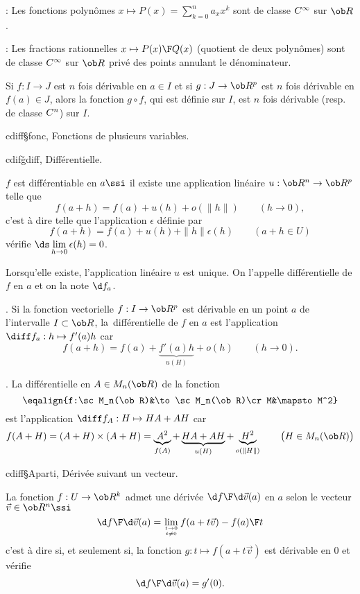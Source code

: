 \Remarque : Les fonctions polynômes $x\mapsto P(x)=\sum_{k=0}^n a_xx^k$ sont de classe $\sc C^\infty$ 
sur $\ob R$. 
\bigskip

\Remarque  : Les fractions rationnelles $x\mapsto {P(x)\F Q(x)}$ (quotient de deux polynômes) sont de classe $\sc C^\infty$ sur $\ob R$ privé des points annulant le dénominateur. 
\bigskip

\Theoreme [$I$ et $J$ intervalles] 
Si $f:I\to J$ est $n$ fois dérivable en $a\in I$ et si $g:J\to\ob R^p$ est $n$ fois dérivable en $f(a)\in J$, 
alors la fonction $g\circ f$, qui est définie sur $I$, est $n$ fois dérivable (resp. de classe $\sc C^n$) sur $I$. 

\Section cdiff§fonc, Fonctions de plusieurs variables. 

\Subsection cdifǧdiff, Différentielle.

\Definition [$U$ ouvert de $\ob R^n$, $f:U\to\ob R^p$, $a\in U$] 
$f$ est différentiable en $a\ssi$ il existe une application linéaire $u:\ob R^n\to\ob R^p$ telle que 
$$
f(a+h)=f(a)+u(h)+o(\|h\|)\qquad(h\to0), 
$$
c'est à dire telle que l'application $\epsilon$ définie par 
$$
f(a+h)=f(a)+u(h)+\|h\|\epsilon(h)\qquad(a+h\in U)
$$ 
vérifie $\ds\lim\limits_{h\to0}\epsilon(h)=0$. 

\Propriete Lorsqu'elle existe, l'application linéaire $u$ est unique. On l'appelle différentielle de $f$ en $a$ et on la note $\d f_a$. 


\Exemple. Si la fonction vectorielle $f:I\to\ob R^p$ est dérivable en un point $a$ de l'intervalle $I\subset\ob R$, la~différentielle de $f$ en $a$ est l'application $\diff f_a:h\mapsto f'(a)h$ car 
$$
f(a+h)=f(a)+\underbrace{f'(a)h}_{u(H)}+o(h)\qquad(h\to 0). 
$$


\Exemple. La différentielle en $A\in\sc M_n(\ob R)$ de la fonction
$$
\eqalign{f:\sc M_n(\ob R)&\to\sc M_n(\ob R)\cr
M&\mapsto M^2}
$$
est l'application $\diff f_A:H\mapsto HA+AH$ car 
$$
f(A+H)=(A+H)\times(A+H)=\underbrace{A^2}_{f(A)}+\underbrace{HA+AH}_{u(H)}
+\underbrace{H^2}_{o(\|H\|)}\qquad\big(H\in\sc M_n(\ob R)\big)
$$


\Subsection cdiff§Aparti, Dérivée suivant un vecteur.


\Definition[$a\in U$ ouvert de $\ob R^n$]
La fonction $f:U\to\ob R^k$ admet une dérivée ${\d f\F\d\vec v}(a)$ en $a$ selon le vecteur $\vec v\in\ob R^n\ssi$ 
$$
{\d f\F\d\vec v}(a)=\lim\limits_{t\to0\atop t\neq 0}{f(a+t\vec v)-f(a)\F t}
$$
c'est à dire si, et seulement si, la fonction $g:t\mapsto f(a+t\vec v)$ est dérivable en $0$ et vérifie $$
{\d f\F\d\vec v}(a)=g'(0).
$$ 

